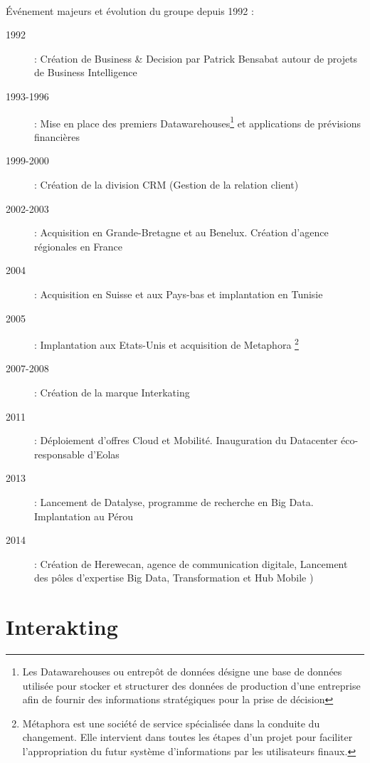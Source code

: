         \paragraph{}
       	  Événement majeurs et évolution du groupe depuis 1992 : 
       	  \newline
       	  \begin{description}
       	  \item[1992] : Création de Business \& Decision par Patrick Bensabat autour de projets de Business Intelligence
       	  \item[1993-1996] : Mise en place des premiers Datawarehouses\footnote{Les Datawarehouses ou entrepôt de données désigne une base de données utilisée pour stocker et structurer des données de production d'une entreprise afin de fournir des informations stratégiques pour la prise de décision} et applications de prévisions financières
       	  \item[1999-2000] : Création de la division CRM (Gestion de la relation client)
       	  \item[2002-2003] : Acquisition en Grande-Bretagne et au Benelux. Création d'agence régionales en France
       	  \item[2004] : Acquisition en Suisse et aux Pays-bas et implantation en Tunisie
       	  \item[2005] : Implantation aux Etats-Unis et acquisition de Metaphora \footnote{Métaphora est une société de service spécialisée dans la conduite du changement. Elle intervient dans toutes les étapes d’un projet pour faciliter l’appropriation du futur système d’informations par les utilisateurs finaux.}
       	  \item[2007-2008] : Création de la marque Interkating
       	  \item[2011] : Déploiement d'offres Cloud et Mobilité. Inauguration du Datacenter éco-responsable d'Eolas
       	  \item[2013] : Lancement de Datalyse, programme de recherche en Big Data. Implantation au Pérou
       	  \item[2014] : Création de Herewecan, agence de communication digitale, Lancement des pôles d'expertise Big Data, Transformation et Hub Mobile )
       	  \end{description}
       	  
\section{Interakting}

